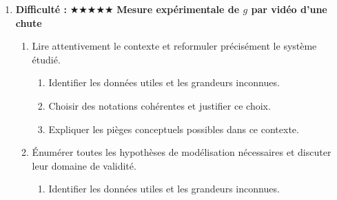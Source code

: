 \documentclass[11pt,a4paper]{article}
\newcommand{\etoiles}[1]{\textbf{Difficulté : }#1}
\begin{document}
\begin{enumerate}[label=\textbf{Très long \arabic*.},leftmargin=*]
\begin{enumerate}[label=\textbf{\arabic*)}]
\begin{enumerate}[label=\alph*)]
\item Discuter la robustesse du résultat face à une variation de paramètre.
\item Proposer une ouverture vers une situation réelle plus complexe.
\end{enumerate}
\item Imaginer un protocole expérimental ou numérique permettant de confronter le modèle à des mesures.
\begin{enumerate}[label=\alph*)]
\item Comparer au moins deux scénarios différents.
\item Discuter la robustesse du résultat face à une variation de paramètre.
\item Proposer une ouverture vers une situation réelle plus complexe.
\end{enumerate}
\item Rédiger une conclusion scientifique : résultats, limites, prolongements vers la Terminale ou au-delà.
\begin{enumerate}[label=\alph*)]
\item Comparer au moins deux scénarios différents.
\item Discuter la robustesse du résultat face à une variation de paramètre.
\item Proposer une ouverture vers une situation réelle plus complexe.
\end{enumerate}
\end{enumerate}
\item \etoiles{★★★★★}
\textbf{Mesure expérimentale de $g$ par vidéo d'une chute}
\begin{enumerate}[label=\textbf{\arabic*)}]
\item Lire attentivement le contexte et reformuler précisément le système étudié.
\begin{enumerate}[label=\alph*)]
\item Identifier les données utiles et les grandeurs inconnues.
\item Choisir des notations cohérentes et justifier ce choix.
\item Expliquer les pièges conceptuels possibles dans ce contexte.
\end{enumerate}
\item Énumérer toutes les hypothèses de modélisation nécessaires et discuter leur domaine de validité.
\begin{enumerate}[label=\alph*)]
\item Identifier les données utiles et les grandeurs inconnues.

\end{enumerate}
\end{enumerate}
\end{enumerate}
\end{document}
